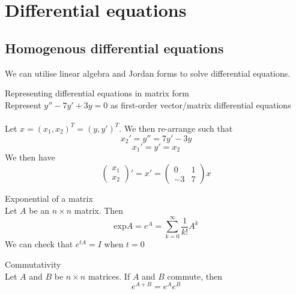 \documentclass[journal, letterpaper]{IEEEtran}
\begin{document}
    \section{Differential equations}
    \subsection{Homogenous differential equations}
    We can utilise linear algebra and Jordan forms to solve differential equations.
    \begin{myboxg}{Representing differential equations in matrix form} \\ 
        Represent $y'' - 7y' + 3y = 0$ as first-order vector/matrix differential equations 
        \\ \\
        Let $x = (x_1, x_2)^T = (y, y')^T$. We then re-arrange such that
        $$ x_2' = y'' = 7y' - 3y$$
        $$ x_1' = y' = x_2$$
        We then have
        $$ \begin{pmatrix}
            x_1 \\ x_2
        \end{pmatrix}' = x' = \begin{pmatrix}
            0 & 1 \\ 
            -3 & 7
        \end{pmatrix}x$$
    \end{myboxg}
    \begin{mybox}{Exponential of a matrix} \\ 
        Let $A$ be an $n \times n$ matrix. Then
        $$ \text{exp} A = e^A = \sum_{k=0}^\infty \frac{1}{k!}A^k$$
        We can check that $e^{tA} = I$ when $t = 0$
        \begin{myboxr}{Commutativity} \\ 
            Let $A$ and $B$ be $n \times n$ matrices. If $A$ and $B$ commute, then
            $$ e^{A + B} = e^Ae^B$$
        \end{myboxr}
    \end{mybox}
\end{document}

